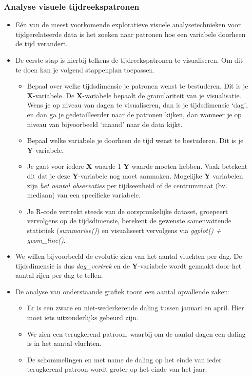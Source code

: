 \documentclass[]{tufte-book}
\providecommand{\tightlist}{%
  \setlength{\itemsep}{0pt}\setlength{\parskip}{0pt}}
\begin{document}
\hypertarget{analyse-visuele-tijdreekspatronen}{%
\subsubsection{Analyse visuele tijdreekspatronen}\label{analyse-visuele-tijdreekspatronen}}

\begin{itemize}
\tightlist
\item
  Eén van de meest voorkomende exploratieve visuele analysetechnieken voor tijdgerelateerde data is het zoeken naar patronen hoe een variabele doorheen de tijd verandert.
\item
  De eerste stap is hierbij telkens de tijdreekspatronen te visualiseren. Om dit te doen kan je volgend stappenplan toepassen.

  \begin{itemize}
  \tightlist
  \item
    Bepaal over welke tijdsdimensie je patronen wenst te bestuderen. Dit is je \textbf{X}-variabele. De \textbf{X}-variabele bepaalt de granulariteit van je visualisatie. Wens je op niveau van dagen te visualiseren, dan is je tijdsdimensie `dag', en dan ga je gedetailleerder naar de patronen kijken, dan wanneer je op niveau van bijvoorbeeld `maand' naar de data kijkt.
  \item
    Bepaal welke variabele je doorheen de tijd wenst te bestuderen. Dit is je \textbf{Y}-variabele.
  \item
    Je gaat voor iedere \textbf{X} waarde 1 \textbf{Y} waarde moeten hebben. Vaak betekent dit dat je deze \textbf{Y}-variabele nog moet aanmaken. Mogelijke \textbf{Y} variabelen zijn \emph{het aantal observaties} per tijdseenheid of de centrummaat (bv. mediaan) van een specifieke variabele.
  \item
    Je R-code vertrekt steeds van de oorspronkelijke dataset, groepeert vervolgens op de tijdsdimensie, berekent de gewenste samenvattende statistiek (\emph{summarise()}) en visualiseert vervolgens via \emph{ggplot() + geom\_line()}.
  \end{itemize}
\item
  We willen bijvoorbeeld de evolutie zien van het aantal vluchten per dag. De tijdsdimensie is dus \emph{dag\_vertrek} en de \textbf{Y}-variabele wordt gemaakt door het aantal rijen per dag te tellen.
\item
  De analyse van onderstaande grafiek toont een aantal opvallende zaken:

  \begin{itemize}
  \tightlist
  \item
    Er is een zware en niet-wederkerende daling tussen januari en april. Hier moet iets uitzonderlijks gebeurd zijn.
  \item
    We zien een terugkerend patroon, waarbij om de aantal dagen een daling is in het aantal vluchten.
  \item
    De schommelingen en met name de daling op het einde van ieder terugkerend patroon wordt groter op het einde van het jaar.
  \end{itemize}
\end{itemize}
\end{document}
